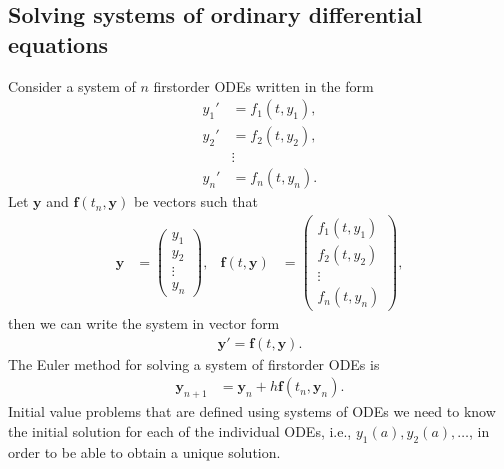 \documentclass[letterpaper,10pt,english]{jupyterBook}
\begin{document}
\subsection{Solving systems of ordinary differential equations}
\label{\detokenize{1_IVPs/1.5_Higher_Order_ODEs:solving-systems-of-ordinary-differential-equations}}\label{\detokenize{1_IVPs/1.5_Higher_Order_ODEs:solving-systems-of-odes-section}}
\sphinxAtStartPar
Consider a system of \(n\) first\sphinxhyphen{}order ODEs written in the form
\begin{align*}
    y_1' &= f_1(t, y_1), \\
    y_2' &= f_2(t, y_2), \\
    & \vdots \\
    y_n' &= f_n(t, y_n).
\end{align*}
\sphinxAtStartPar
Let \(\mathbf{y}\) and \(\mathbf{f}(t_n, \mathbf{y})\) be vectors such that
\begin{align*}
    \mathbf{y} &= \begin{pmatrix} y_1 \\ y_2 \\ \vdots \\ y_n \end{pmatrix}, &
    \mathbf{f}(t, \mathbf{y}) &= 
    \begin{pmatrix} f_1(t, y_1) \\ f_2(t, y_2) \\ \vdots \\ f_n(t, y_n) \end{pmatrix},
\end{align*}
\sphinxAtStartPar
then we can write the system in vector form
\begin{align*}
    \mathbf{y}' = \mathbf{f}(t, \mathbf{y}).
\end{align*}
\sphinxAtStartPar
The Euler method for solving a system of first\sphinxhyphen{}order ODEs is
\begin{align*}
    \mathbf{y}_{n+1} &= \mathbf{y}_n + h \mathbf{f}(t_n, \mathbf{y}_n).
\end{align*}
\sphinxAtStartPar
Initial value problems that are defined using systems of ODEs we need to know the initial solution for each of the individual ODEs, i.e., \(y_1(a), y_2(a), \ldots\), in order to be able to obtain a unique solution.
\end{document}
